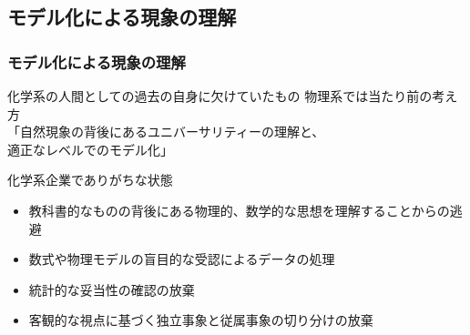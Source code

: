 \documentclass[12pt, dvipdfmx]{beamer}
\begin{document}
\subsection{モデル化による現象の理解}
\begin{frame}
    \frametitle{モデル化による現象の理解}
    \begin{alertblock}{化学系の人間としての過去の自身に欠けていたもの}
        物理系では当たり前の考え方\\
        「自然現象の背後にあるユニバーサリティーの理解と、\\適正なレベルでのモデル化」
    \end{alertblock}

    \begin{block}{化学系企業でありがちな状態}
        \begin{itemize}
            \item 教科書的なものの背後にある物理的、数学的な思想を理解することからの逃避
            \item 数式や物理モデルの盲目的な受認によるデータの処理
            \item 統計的な妥当性の確認の放棄
            \item 客観的な視点に基づく独立事象と従属事象の切り分けの放棄
        \end{itemize}
    \end{block}
\end{frame}
\end{document}
